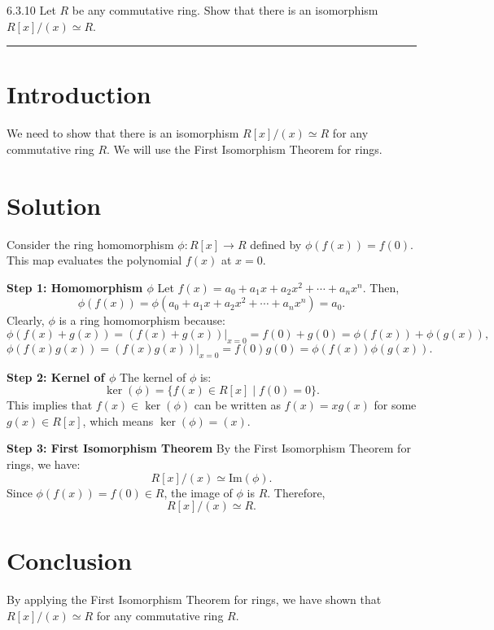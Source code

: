\documentclass[12pt]{amsart}
\theoremstyle{definition}
\numberwithin{equation}{section}
\begin{document}
\newpage
\begin{exercise}{6.3.10} Let \(R\) be any commutative ring. Show that there is an isomorphism \(R[x]/(x) \simeq R\).

    \noindent\rule{\linewidth}{1pt}

    \section*{Introduction}
    We need to show that there is an isomorphism \(R[x]/(x) \simeq R\) for any commutative ring \(R\). We will use the First Isomorphism Theorem for rings.

    \section*{Solution}
    Consider the ring homomorphism \(\phi: R[x] \to R\) defined by \(\phi(f(x)) = f(0)\). This map evaluates the polynomial \(f(x)\) at \(x = 0\).

    \noindent \textbf{Step 1: Homomorphism \(\phi \)}
    Let \(f(x) = a_0 + a_1 x + a_2 x^2 + \cdots + a_n x^n\). Then,
    \[
    \phi(f(x)) = \phi(a_0 + a_1 x + a_2 x^2 + \cdots + a_n x^n) = a_0.
    \]
    Clearly, \(\phi \) is a ring homomorphism because:
    \[
    \phi(f(x) + g(x)) = (f(x) + g(x))|_{x=0} = f(0) + g(0) = \phi(f(x)) + \phi(g(x)),
    \]
    \[
    \phi(f(x)g(x)) = (f(x)g(x))|_{x=0} = f(0)g(0) = \phi(f(x))\phi(g(x)).
    \]

    \noindent \textbf{Step 2: Kernel of \(\phi \)}
    The kernel of \(\phi \) is:
    \[
    \ker(\phi) = \{ f(x) \in R[x] \mid f(0) = 0 \}.
    \]
    This implies that \(f(x) \in \ker(\phi)\) can be written as \(f(x) = xg(x)\) for some \(g(x) \in R[x]\), which means \(\ker(\phi) = (x)\).

    \noindent \textbf{Step 3: First Isomorphism Theorem}
    By the First Isomorphism Theorem for rings, we have:
    \[
    R[x]/(x) \simeq \text{Im}(\phi).
    \]
    Since \(\phi(f(x)) = f(0) \in R\), the image of \(\phi \) is \(R\). Therefore,
    \[
    R[x]/(x) \simeq R.
    \]

    \section*{Conclusion}
    By applying the First Isomorphism Theorem for rings, we have shown that \(R[x]/(x) \simeq R\) for any commutative ring \(R\).

\end{exercise}
\end{document}
